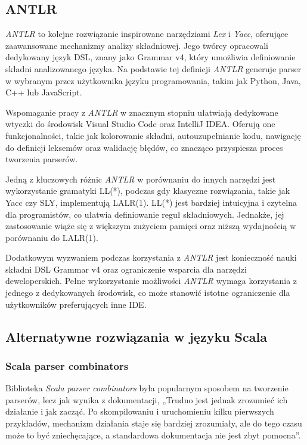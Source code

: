 \subsection{ANTLR}
\label{subsec:antlr}

\textit{ANTLR} to kolejne rozwiązanie inspirowane narzędziami \textit{Lex} i \textit{Yacc}, oferujące zaawansowane mechanizmy analizy składniowej.
Jego twórcy opracowali dedykowany język DSL, znany jako Grammar v4, który umożliwia definiowanie składni analizowanego języka.
Na podstawie tej definicji \textit{ANTLR} generuje parser w wybranym przez użytkownika języku programowania, takim jak Python, Java, C++ lub JavaScript.

Wspomaganie pracy z \textit{ANTLR} w znacznym stopniu ułatwiają dedykowane wtyczki do środowisk Visual Studio Code oraz IntelliJ IDEA. Oferują one funkcjonalności, takie jak kolorowanie składni, autouzupełnianie kodu, nawigację do definicji leksemów oraz walidację błędów, co znacząco przyspiesza proces tworzenia parserów.

Jedną z kluczowych różnic \textit{ANTLR} w porównaniu do innych narzędzi jest wykorzystanie gramatyki LL(*), podczas gdy klasyczne rozwiązania, takie jak Yacc czy SLY, implementują LALR(1).
LL(*) jest bardziej intuicyjna i czytelna dla programistów, co ułatwia definiowanie reguł składniowych.
Jednakże, jej zastosowanie wiąże się z większym zużyciem pamięci oraz niższą wydajnością w porównaniu do LALR(1).

Dodatkowym wyzwaniem podczas korzystania z \textit{ANTLR} jest konieczność nauki składni DSL Grammar v4 oraz ograniczenie wsparcia dla narzędzi deweloperskich.
Pełne wykorzystanie możliwości \textit{ANTLR} wymaga korzystania z jednego z dedykowanych środowisk, co może stanowić istotne ograniczenie dla użytkowników preferujących inne IDE\@.

\subsection{Alternatywne rozwiązania w języku Scala}
\label{subsec:rozwiazania-w-jezyku-scal}

\subsubsection{Scala parser combinators}
\label{subsubsec:scala-parser-combinators}

Biblioteka \textit{Scala parser combinators}\cite{moors2008parser} była popularnym sposobem na tworzenie parserów, lecz jak wynika z dokumentacji, „Trudno jest jednak zrozumieć ich działanie i jak zacząć.
Po skompilowaniu i uruchomieniu kilku pierwszych przykładów, mechanizm działania staje się bardziej zrozumiały, ale do tego czasu może to być zniechęcające, a standardowa dokumentacja nie jest zbyt pomocna”\cite{parser-combinators-readme}.


